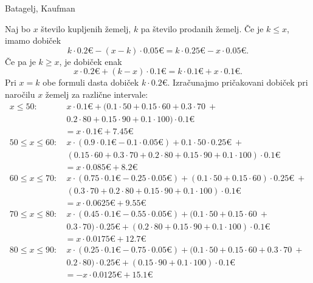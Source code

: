 \begin{naloga}{Batagelj, Kaufman}{\cite[Naloga~4.2]{bk}}
\begin{odgovor}
Naj bo $x$ število kupljenih žemelj, $k$ pa število prodanih žemelj.
Če je $k \le x$, imamo dobiček
$$
k \cdot 0.2 € - (x-k) \cdot 0.05 € = k \cdot 0.25 € - x \cdot 0.05 € .
$$
Če pa je $k \ge x$, je dobiček enak
$$
x \cdot 0.2 € + (k-x) \cdot 0.1 € = k \cdot 0.1 € + x \cdot 0.1 € .
$$
Pri $x = k$ obe formuli dasta dobiček $k \cdot 0.2 €$.
Izračunajmo pričakovani dobiček pri naročilu $x$ žemelj za različne intervale:
\begin{align*}
x \le 50:         &\ x \cdot 0.1 € +
                     (0.1 \cdot 50 + 0.15 \cdot 60 + 0.3 \cdot 70 \ + \\
                  &\  0.2 \cdot 80 + 0.15 \cdot 90 + 0.1 \cdot 100)
                     \cdot 0.1 € \\
                  &= x \cdot 0.1 € + 7.45 € \\
50 \le x \le 60:  &\ x \cdot (0.9 \cdot 0.1 € - 0.1 \cdot 0.05 €) +
                     0.1 \cdot 50 \cdot 0.25 € \ + \\
                  &\ (0.15 \cdot 60 + 0.3 \cdot 70 + 0.2 \cdot 80 +
                      0.15 \cdot 90 + 0.1 \cdot 100) \cdot 0.1 € \\
                  &= x \cdot 0.085 € + 8.2 € \\
60 \le x \le 70:  &\ x \cdot (0.75 \cdot 0.1 € - 0.25 \cdot 0.05 €) +
                     (0.1 \cdot 50 + 0.15 \cdot 60) \cdot 0.25 € \ + \\
                  &\ (0.3 \cdot 70 + 0.2 \cdot 80 + 0.15 \cdot 90 +
                      0.1 \cdot 100) \cdot 0.1 € \\
                  &=  x \cdot 0.0625 € + 9.55 € \\
70 \le x \le 80:  &\ x \cdot (0.45 \cdot 0.1 € - 0.55 \cdot 0.05 €) +
                     (0.1 \cdot 50 + 0.15 \cdot 60 \ + \\
                  &\ 0.3 \cdot 70) \cdot 0.25 € +
                     (0.2 \cdot 80 + 0.15 \cdot 90 + 0.1 \cdot 100)
                     \cdot 0.1 € \\
                  &= x \cdot 0.0175 € + 12.7 € \\
80 \le x \le 90:  &\ x \cdot (0.25 \cdot 0.1 € - 0.75 \cdot 0.05 €) +
                     (0.1 \cdot 50 + 0.15 \cdot 60 + 0.3 \cdot 70 \ + \\
                  &\  0.2 \cdot 80) \cdot 0.25 € +
                     (0.15 \cdot 90 + 0.1 \cdot 100) \cdot 0.1 € \\
                  &= -x \cdot 0.0125 € + 15.1 € \\

\end{align*}
\end{odgovor}
\end{naloga}

